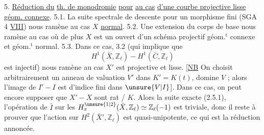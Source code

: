 5. \uline{Réduction du} \uline{th. de monodromie} \uline{pour}   \uline{au cas} \uline{d'une courbe projective lisse} \uline{géom. connexe}.
5.1. La suite spectrale de descente   pour un morphisme fini (SGA 4 \uline{VIII}) nous ramène au cas $X$ \uline{normal}.
5.2.  Une extension   du corps de base nous ramène au cas où de plus $X$ est un ouvert d'un schéma projectif   géom.$^{\mathrm t}$ connexe et géom.$^{\mathrm t}$ normal.
5.3. Dans ce cas, 3.2 (qui implique que
\[H^1(\bar X,\mathbb Z_\ell)-H^1(\bar C,\mathbb Z_\ell)\]
est injectif) nous ramène au cas  $X'$ est   projective et lisse.
[\uline{NB}  On choisit arbitrairement un anneau de valuation $V'$ dans $K'=K(t)$,  domine $V$ \unsure{\}}; alors l'image de $I'-I$ est d'indice fini dans $\unsure{V|I}$].
Dans ce cas,  on peut encore supposer que  $X'-X$ sont rat / $K$. Alors  la suite exacte (2.5.1), l'opération de $\bar I$ sur les $H^{\unsure{1|2}}_x(\bar X,\mathbb Z_\ell)\simeq\mathbb Z_\ell(-1)$ est triviale, donc il reste à prouver que l'action sur $H^2(\bar X',\mathbb Z_\ell)$ est quasi-unipotente, ce qui est la réduction annoncée.
